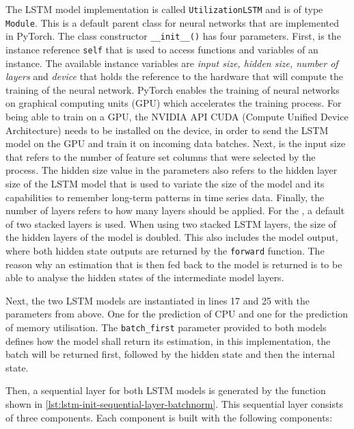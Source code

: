   The LSTM model implementation is called \texttt{UtilizationLSTM} and is of type \texttt{Module}. This is a default parent class for neural networks that are implemented in PyTorch.
  The class constructor \texttt{\_\_init\_\_()} has four parameters. First, is the instance reference \texttt{self} that is used to access functions and variables of an instance. 
  The available instance variables are \emph{input size, hidden size, number of layers} and \emph{device} that holds the reference to the hardware that will compute the training of the neural network.
  PyTorch enables the training of neural networks on graphical computing units (GPU) which accelerates the training process. For being able to train on a GPU, the NVIDIA API CUDA (Compute Unified Device Architecture) needs to be installed on the device, in order to send the LSTM model on the GPU and train it on incoming data batches. 
  Next, is the input size that refers to the number of feature set columns that were selected by the  process.
  The hidden size value in the parameters also refers to the hidden layer size of the LSTM model that is used to variate the size of the model and its capabilities to remember long-term patterns in time series data.
  Finally, the number of layers refers to how many  layers should be applied.
  For the , a default of two stacked layers is used. When using two stacked LSTM layers, the size of the hidden layers of the model is doubled. This also includes the model output, where both hidden state outputs are returned by the \texttt{forward} function.
  The reason why an estimation that is then fed back to the model is returned is to be able to analyse the hidden states of the intermediate model layers.
  
  Next, the two LSTM models are instantiated in lines 17 and 25 with the parameters from above. One for the prediction of CPU and one for the prediction of memory utilisation. The \texttt{batch\_first} parameter provided to both models defines how the model shall return its estimation, in this implementation, the batch will be returned first, followed by the hidden state and then the internal state.
  
  Then, a sequential layer for both LSTM models is generated by the function shown in \ref{lst:lstm-init-sequential-layer-batchnorm}. This sequential layer consists of three components. Each component is built with the following components:
  
